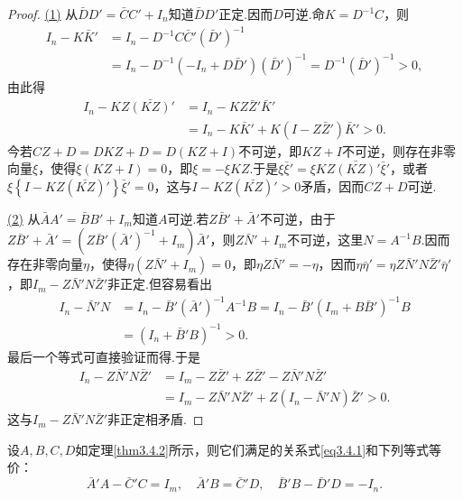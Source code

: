 \begin{proof}
	\hyperlink{3.4.3}{(1)}
	从$\bar{D}D'=\bar{C}C'+I_n$知道$\bar{D}D'$正定.因而$D$可逆.命$K=D^{-1}C$，则
	\begin{align*}
		I_n-K\bar{K}'
		&=I_n-D^{-1}C\bar{C}'(\bar{D}')^{-1}\\
		&=I_n-D^{-1}(-I_n+D\bar{D}')(\bar{D}')^{-1}=D^{-1}(\bar{D}')^{-1}>0,
	\end{align*}
	由此得
	\begin{align*}
		I_n-KZ\bar{(KZ)}'
		&=I_n-KZ\bar{Z}'\bar{K}'\\
		&=I_n-K\bar{K}'+K(I-Z\bar{Z}')\bar{K}'>0.
	\end{align*}
今若$CZ+D=DKZ+D=D(KZ+I)$不可逆，即$KZ+I$不可逆，则存在非零向量$\xi$，使得$\xi(KZ+I)=0$，即$\xi=-\xi KZ$.于是$\xi\bar{\xi}'=\xi KZ\bar{(KZ)}'\bar{\xi}'$，或者$\xi\left\{I-KZ(\bar{KZ})'\right\}\bar{\xi}'=0$，这与$I-KZ(\bar{KZ})'>0$矛盾，因而$CZ+D$可逆.
	
	\hyperlink{3.4.3}{(2)}
	从$\bar{A}A'=\bar{B}B'+I_m$知道$A$可逆.若$Z\bar{B}'+\bar{A}'$不可逆，由于$Z\bar{B}'+\bar{A}'=(Z\bar{B}'(\bar{A}')^{-1}+I_m)\bar{A}'$，则$Z\bar{N}'+I_m$不可逆，这里$N=A^{-1}B$.因而存在非零向量$\eta$，使得$\eta(Z\bar{N}'+I_m)=0$，即$\eta Z\bar{N}'=-\eta$，因而$\eta\bar{\eta}'=\eta Z\bar{N}'N\bar{Z}'\bar{\eta}'$，即$I_m-Z\bar{N}'N\bar{Z}'$非正定.但容易看出
	\begin{align*}
		I_n-\bar{N}'N
		&=I_n-\bar{B}'(\bar{A}')^{-1}A^{-1}B=I_n-\bar{B}'(I_m+B\bar{B}')^{-1}B\\
		&=(I_n+\bar{B}'B)^{-1}>0.
	\end{align*}
最后一个等式可直接验证而得.于是
\begin{align*}
	I_n-Z\bar{N}'N\bar{Z}'
	&=I_m-Z\bar{Z}'+Z\bar{Z}'-Z\bar{N}'N\bar{Z}'\\
	&=I_m-Z\bar{N}'N\bar{Z}'+Z(I_n-\bar{N}'N)\bar{Z}'>0.
\end{align*}
这与$I_m-Z\bar{N}'N\bar{Z}'$非正定相矛盾.
\end{proof}
\begin{lemma}\label{lem3.4.4}
	设$A,B,C,D$如定理\ref{thm3.4.2}所示，则它们满足的关系式\eqref{eq3.4.1}和下列等式等价：
	\begin{equation}\label{eq3.4.3}
		\bar{A}'A-\bar{C}'C=I_m,\quad \bar{A}'B=\bar{C}'D,\quad \bar{B}'B-\bar{D}'D=-I_n.
	\end{equation}
\end{lemma}
